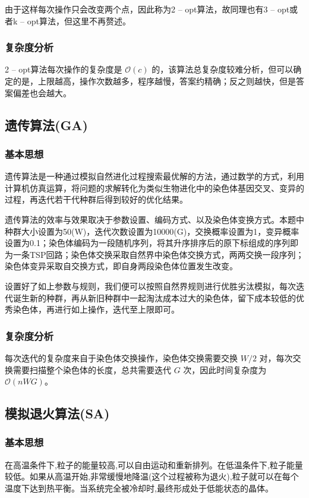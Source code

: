 \documentclass[lang=cn,11pt,a4paper]{elegantpaper}
\begin{document}
由于这样每次操作只会改变两个点，因此称为2 – opt算法，故同理也有3 – opt或者k – opt算法，但这里不再赘述。

\subsubsection{复杂度分析}
2 – opt算法每次操作的复杂度是 $\mathcal{O}\left(c\right)$ 的，该算法总复杂度较难分析，但可以确定的是，上限越高，操作次数越多，程序越慢，答案约精确；反之则越快，但是答案偏差也会越大。


\subsection{遗传算法(GA)}
\subsubsection{基本思想}
遗传算法是一种通过模拟自然进化过程搜索最优解的方法，通过数学的方式，利用计算机仿真运算，将问题的求解转化为类似生物进化中的染色体基因交叉、变异的过程，再迭代若干代种群后得到较好的优化结果。

遗传算法的效率与效果取决于参数设置、编码方式、以及染色体变换方式。本题中种群大小设置为50(W)，迭代次数设置为10000(G)，交换概率设置为1，变异概率设置为0.1；染色体编码为一段随机序列，将其升序排序后的原下标组成的序列即为一条TSP回路；染色体交换采取自然界中染色体交换方式，两两交换一段序列；染色体变异采取自交换方式，即自身两段染色体位置发生改变。

设置好了如上参数与规则，我们便可以按照自然界规则进行优胜劣汰模拟，每次迭代诞生新的种群，再从新旧种群中一起淘汰成本过大的染色体，留下成本较低的优秀染色体，再进行如上操作，迭代至上限即可。

\subsubsection{复杂度分析}
每次迭代的复杂度来自于染色体交换操作，染色体交换需要交换 $W/2$ 对，每次交换需要扫描整个染色体的长度，总共需要迭代 $G$ 次，因此时间复杂度为 $\mathcal{O}\left(nWG\right)$。


\subsection{模拟退火算法(SA)}
\subsubsection{基本思想}
在高温条件下,粒子的能量较高,可以自由运动和重新排列。在低温条件下,粒子能量较低。如果从高温开始,非常缓慢地降温(这个过程被称为退火),粒子就可以在每个温度下达到热平衡。当系统完全被冷却时,最终形成处于低能状态的晶体。
\end{document}

